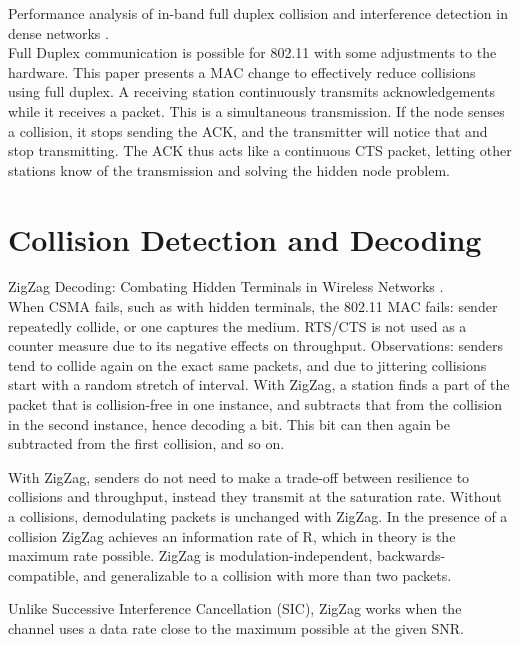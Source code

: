 Performance analysis of in-band full duplex collision and interference detection in dense networks \cite{vermeulen2016}.\\

Full Duplex communication is possible for 802.11 with some adjustments to the hardware. This paper presents a MAC change to effectively reduce collisions using full duplex. A receiving station continuously transmits acknowledgements while it receives a packet. This is a simultaneous transmission. If the node senses a collision, it stops sending the ACK, and the transmitter will notice that and stop transmitting. The ACK thus acts like a continuous CTS packet, letting other stations know of the transmission and solving the hidden node problem.



\section{Collision Detection and Decoding}

ZigZag Decoding: Combating Hidden Terminals in Wireless Networks \cite{gollakota2008}.\\

When CSMA fails, such as with hidden terminals, the 802.11 MAC fails: sender repeatedly collide, or one captures the medium. RTS/CTS is not used as a counter measure due to its negative effects on throughput. Observations: senders tend to collide again on the exact same packets, and due to jittering collisions start with a random stretch of interval. With ZigZag, a station finds a part of the packet that is collision-free in one instance, and subtracts that from the collision in the second instance, hence decoding a bit. This bit can then again be subtracted from the first collision, and so on.

With ZigZag, senders do not need to make a trade-off between resilience to collisions and throughput, instead they transmit at the saturation rate. Without a collisions, demodulating packets is unchanged with ZigZag. In the presence of a collision ZigZag achieves an information rate of R, which in theory is the maximum rate possible. ZigZag is modulation-independent, backwards-compatible, and generalizable to a collision with more than two packets.

Unlike Successive Interference Cancellation (SIC), ZigZag works when the channel uses a data rate close to the maximum possible at the given SNR.


